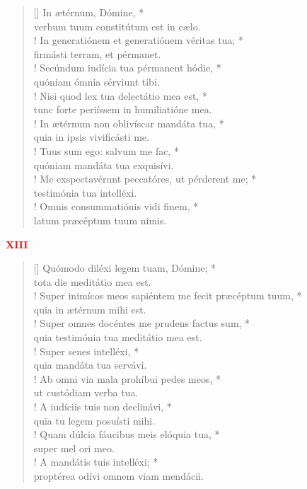\begin{verse}[\versewidth]
In ætérnum, Dómine, *\\
verbum tuum constitútum est in cælo.\\!
\vin In generatiónem et generatiónem véritas tua; *\\
\vin firmásti terram, et pérmanet.\\!
Secúndum iudícia tua pérmanent hódie, *\\
quóniam ómnia sérviunt tibi.\\!
\vin Nisi quod lex tua delectátio mea est, *\\
\vin tunc forte periíssem in humiliatióne mea.\\!
In ætérnum non oblivíscar mandáta tua, *\\
quia in ipsis vivificásti me.\\!
\vin Tuus sum ego: salvum me fac, *\\
\vin quóniam mandáta tua exquisívi.\\!
Me exspectavérunt peccatóres, ut pérderent me; *\\
testimónia tua intelléxi.\\!
\vin Omnis consummatiónis vidi finem, *\\
\vin latum præcéptum tuum nimis.\\
\end{verse}
\begin{center}
\textcolor{red}{\bf XIII}\\
\end{center}
\begin{verse}[\versewidth]
Quómodo diléxi legem tuam, Dómine; *\\
tota die meditátio mea est.\\!
\vin Super inimícos meos sapiéntem me fecit præcéptum tuum, *\\
\vin quia in ætérnum mihi est.\\!
Super omnes docéntes me prudens factus sum, *\\
quia testimónia tua meditátio mea est.\\!
\vin Super senes intelléxi, *\\
\vin quia mandáta tua servávi.\\!
Ab omni via mala prohíbui pedes meos, *\\
ut custódiam verba tua.\\!
\vin A iudíciis tuis non declinávi, *\\
\vin quia tu legem posuísti mihi.\\!
Quam dúlcia fáucibus meis elóquia tua, *\\
super mel ori meo.\\!
\vin A mandátis tuis intelléxi; *\\
\vin proptérea odívi omnem viam mendácii.\\
\end{verse}
\vspace{1cm}


